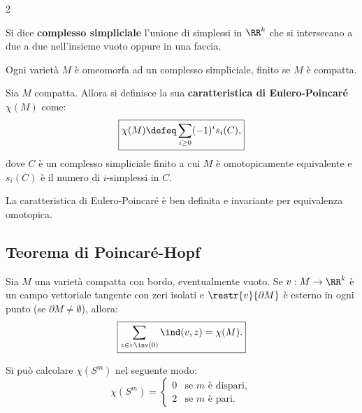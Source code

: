 \begin{multicols*}{2}
    \begin{definition}
        Si dice \textbf{complesso simpliciale} l'unione di
        simplessi in $\RR^k$ che si intersecano a due a due
        nell'insieme vuoto oppure in una faccia.
    \end{definition}

    \begin{fact}
        Ogni varietà $M$ è omeomorfa ad un complesso simpliciale,
        finito se $M$ è compatta.
    \end{fact}

    \begin{definition}
        Sia $M$ compatta. Allora si definisce la sua \textbf{caratteristica
            di Eulero-Poincaré} $\chi(M)$ come:
        \[
            \boxed{\chi(M) \defeq \sum_{i \geq 0} (-1)^i s_i(C),}
        \]
        dove $C$ è un complesso simpliciale finito a cui $M$ è omotopicamente equivalente
        e $s_i(C)$ è il numero di $i$-simplessi in $C$.
    \end{definition}

    \begin{fact}
        La caratteristica di Eulero-Poincaré è ben definita e invariante
        per equivalenza omotopica.
    \end{fact}

    \subsection{Teorema di Poincaré-Hopf}

    \begin{theorem} \label{thm:poincare_hopf}
        Sia $M$ una varietà compatta con bordo, eventualmente vuoto.
        Se $v : M \to \RR^k$ è un campo vettoriale tangente con
        zeri isolati e $\restr{v}{\partial M}$ è esterno in ogni punto
        (se $\partial M \neq \emptyset$), allora:
        \[
            \boxed{\sum_{z \in v\inv(0)} \ind(v, z) = \chi(M).}
        \]
    \end{theorem}

    \begin{corollary}
        Si può calcolare $\chi(S^m)$ nel seguente modo:
        \[
            \boxed{\chi(S^m) = \begin{cases}
                    0 & \text{se $m$ è dispari}, \\
                    2 & \text{se $m$ è pari}.
                \end{cases}}
        \]
    \end{corollary}


\end{multicols*}
